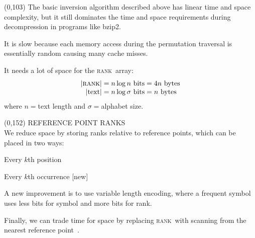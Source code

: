 \documentclass[a4paper]{article} %
\newcommand{\rank}{\textsc{rank}}
\begin{document}
\begin{textblock}{60}(0,103) 
  \footnotesize 
  The basic inversion algorithm described above has linear time and
  space complexity, but it still dominates the time and space
  requirements during decompression in programs like bzip2.
  \vspace{1mm}

  It is slow because each memory access during the permutation 
  traversal is essentially random causing many cache misses.
  \vspace{1mm}

  It needs a lot of space for the \rank\ array:
  \begin{align*}
    |\rank| &= n\log n \textrm{ bits} = 4n \textrm{ bytes}\\[-1mm]
    |\textrm{text}| &= n\log\sigma \textrm{ bits} = n \textrm{ bytes}
  \end{align*}
  where $n={}$text length and $\sigma={}$alphabet size.
\end{textblock}

\begin{textblock}{60}(0,152)
  {\sffamily\normalsize{\color{sciorange}
      REFERENCE POINT RANKS}}\vspace{1mm}\\
  \footnotesize 
  We reduce space by storing ranks relative to reference points,
  which can be placed in two ways:\\

  \begin{minipage}[t]{25mm}
    \scriptsize\sffamily
    \centering
    Every $k$th position~\cite{ll2005}
    \begin{center}
      
    \end{center}
  \end{minipage}
  \hfill
  \begin{minipage}[t]{30mm}
    \scriptsize\sffamily
    \centering
    Every $k$th occurrence [new]
    \begin{center}
      
    \end{center}
  \end{minipage}
  \vspace{3mm}

  \begin{minipage}{42mm}
    \raggedright
    A new improvement is to use variable length encoding, where
    a frequent symbol uses less bits for symbol and more bits for rank.
  \end{minipage}
  \hfill
  \begin{minipage}{17mm}
    \begin{center}
      
    \end{center}
  \end{minipage}
  \vspace{1mm}

  Finally, we can trade time for space by replacing \rank\ with
  scanning from the nearest reference point~\cite{ll2005}.
\end{textblock}
\end{document}
